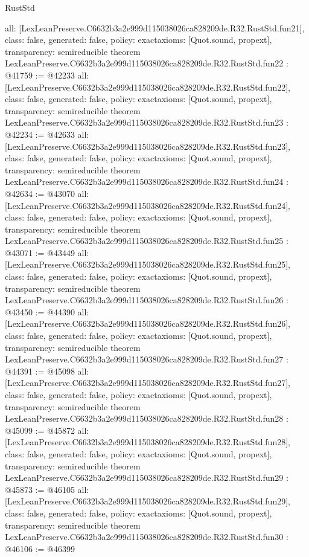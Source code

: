 \begin{lexlean}{RustStd}
\begin{coremodule}
{  all: [LexLeanPreserve.C6632b3a2e999d115038026ca828209de.R32.RustStd.fun21],
  class: false,
  generated: false,
  policy: exact{axioms: [Quot.sound, propext]},
  transparency: semireducible
}
theorem LexLeanPreserve.C6632b3a2e999d115038026ca828209de.R32.RustStd.fun22 : @41759 := @42233 {
  all: [LexLeanPreserve.C6632b3a2e999d115038026ca828209de.R32.RustStd.fun22],
  class: false,
  generated: false,
  policy: exact{axioms: [Quot.sound, propext]},
  transparency: semireducible
}
theorem LexLeanPreserve.C6632b3a2e999d115038026ca828209de.R32.RustStd.fun23 : @42234 := @42633 {
  all: [LexLeanPreserve.C6632b3a2e999d115038026ca828209de.R32.RustStd.fun23],
  class: false,
  generated: false,
  policy: exact{axioms: [Quot.sound, propext]},
  transparency: semireducible
}
theorem LexLeanPreserve.C6632b3a2e999d115038026ca828209de.R32.RustStd.fun24 : @42634 := @43070 {
  all: [LexLeanPreserve.C6632b3a2e999d115038026ca828209de.R32.RustStd.fun24],
  class: false,
  generated: false,
  policy: exact{axioms: [Quot.sound, propext]},
  transparency: semireducible
}
theorem LexLeanPreserve.C6632b3a2e999d115038026ca828209de.R32.RustStd.fun25 : @43071 := @43449 {
  all: [LexLeanPreserve.C6632b3a2e999d115038026ca828209de.R32.RustStd.fun25],
  class: false,
  generated: false,
  policy: exact{axioms: [Quot.sound, propext]},
  transparency: semireducible
}
theorem LexLeanPreserve.C6632b3a2e999d115038026ca828209de.R32.RustStd.fun26 : @43450 := @44390 {
  all: [LexLeanPreserve.C6632b3a2e999d115038026ca828209de.R32.RustStd.fun26],
  class: false,
  generated: false,
  policy: exact{axioms: [Quot.sound, propext]},
  transparency: semireducible
}
theorem LexLeanPreserve.C6632b3a2e999d115038026ca828209de.R32.RustStd.fun27 : @44391 := @45098 {
  all: [LexLeanPreserve.C6632b3a2e999d115038026ca828209de.R32.RustStd.fun27],
  class: false,
  generated: false,
  policy: exact{axioms: [Quot.sound, propext]},
  transparency: semireducible
}
theorem LexLeanPreserve.C6632b3a2e999d115038026ca828209de.R32.RustStd.fun28 : @45099 := @45872 {
  all: [LexLeanPreserve.C6632b3a2e999d115038026ca828209de.R32.RustStd.fun28],
  class: false,
  generated: false,
  policy: exact{axioms: [Quot.sound, propext]},
  transparency: semireducible
}
theorem LexLeanPreserve.C6632b3a2e999d115038026ca828209de.R32.RustStd.fun29 : @45873 := @46105 {
  all: [LexLeanPreserve.C6632b3a2e999d115038026ca828209de.R32.RustStd.fun29],
  class: false,
  generated: false,
  policy: exact{axioms: [Quot.sound, propext]},
  transparency: semireducible
}
theorem LexLeanPreserve.C6632b3a2e999d115038026ca828209de.R32.RustStd.fun30 : @46106 := @46399 {
}
\end{coremodule}
\end{lexlean}
